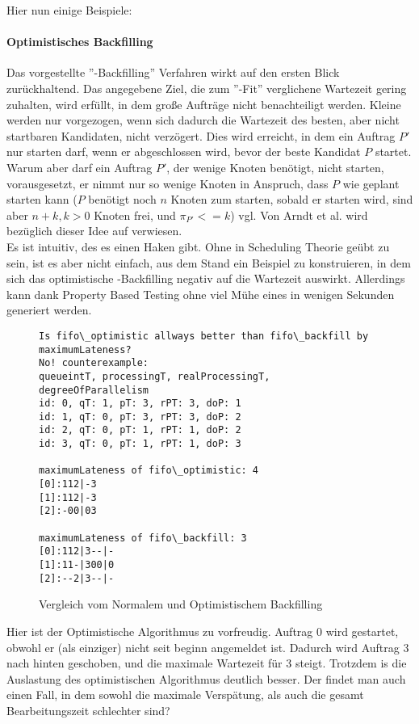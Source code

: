 Hier nun einige Beispiele:\\

\paragraph{Optimistisches Backfilling}
\label{optfill}
Das vorgestellte ''-Backfilling'' Verfahren wirkt auf den ersten Blick zurückhaltend. Das angegebene Ziel, die zum ''-Fit'' verglichene Wartezeit gering zuhalten, wird erfüllt, in dem große Aufträge nicht benachteiligt werden. Kleine werden nur vorgezogen, wenn sich dadurch die Wartezeit des besten, aber nicht startbaren Kandidaten, nicht verzögert. Dies wird erreicht, in dem ein Auftrag $P'$ nur starten darf, wenn er abgeschlossen wird, bevor der beste Kandidat $P$ startet.\\
Warum aber darf ein Auftrag $P'$, der wenige Knoten benötigt, nicht starten, vorausgesetzt, er nimmt nur so wenige Knoten in Anspruch, dass $P$ wie geplant starten kann ($P$ benötigt noch $n$ Knoten zum starten, sobald er starten wird, sind aber $n+k, k>0$ Knoten frei, und $\pi_{P'} <= k$) vgl. 
Von Arndt et al. wird bezüglich dieser Idee auf \cite{optVsCons} verwiesen.\\
Es ist intuitiv, des es einen Haken gibt. Ohne in Scheduling Theorie geübt zu sein, ist es aber nicht einfach, aus dem Stand ein Beispiel zu konstruieren, in dem sich das optimistische -Backfilling negativ auf die Wartezeit auswirkt. Allerdings kann dank Property Based Testing ohne viel Mühe eines in wenigen Sekunden generiert werden.

\begin{figure}
\centering
\begin{verbatim}
Is fifo\_optimistic allways better than fifo\_backfill by maximumLateness?
No! counterexample:
queueintT, processingT, realProcessingT, degreeOfParallelism
id: 0, qT: 1, pT: 3, rPT: 3, doP: 1
id: 1, qT: 0, pT: 3, rPT: 3, doP: 2
id: 2, qT: 0, pT: 1, rPT: 1, doP: 2
id: 3, qT: 0, pT: 1, rPT: 1, doP: 3

maximumLateness of fifo\_optimistic: 4
[0]:112|-3
[1]:112|-3
[2]:-00|03

maximumLateness of fifo\_backfill: 3
[0]:112|3--|-
[1]:11-|300|0
[2]:--2|3--|-
\end{verbatim}
\caption{Vergleich vom Normalem und Optimistischem Backfilling}
\label{onlateness}
\end{figure}

\FloatBarrier

Hier ist der Optimistische Algorithmus zu vorfreudig. Auftrag 0 wird gestartet, obwohl er (als einziger) nicht seit beginn angemeldet ist. Dadurch wird Auftrag 3 nach hinten geschoben, und die maximale Wartezeit für 3 steigt. Trotzdem is die Auslastung des optimistischen Algorithmus deutlich besser. Der findet man auch einen Fall, in dem sowohl die maximale Verspätung, als auch die gesamt Bearbeitungszeit schlechter sind?\\


